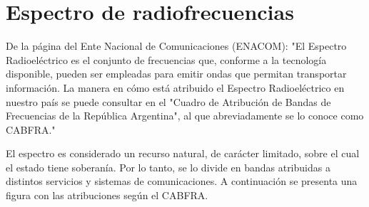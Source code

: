 \section{Espectro de radiofrecuencias}
De la página del Ente Nacional de Comunicaciones (ENACOM): "El Espectro Radioeléctrico es el conjunto de frecuencias que, conforme a la tecnología disponible, pueden ser empleadas para emitir ondas que permitan transportar información. La manera en cómo está atribuido el Espectro Radioeléctrico en nuestro país se puede consultar en el "Cuadro de Atribución de Bandas de Frecuencias de la República Argentina", al que abreviadamente se lo conoce como CABFRA."

El espectro es considerado un recurso natural, de carácter limitado,  sobre el cual el estado tiene soberanía. Por lo tanto, se lo divide en bandas atribuidas a distintos servicios y sistemas de comunicaciones. A continuación se presenta una figura con las atribuciones según el CABFRA. 

